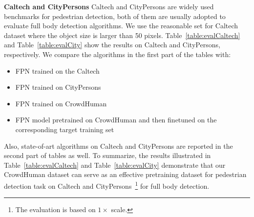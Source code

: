 \documentclass[10pt,twocolumn,letterpaper]{article}
\newcommand{\myparagraph}[1]{{\vspace{0.5em} \noindent \bf #1}}
\begin{document}
\myparagraph{Caltech and CityPersons} Caltech and CityPersons are widely used benchmarks for pedestrian detection, both of them are usually adopted to evaluate full body detection algorithms. %
We use the reasonable set for Caltech dataset where the object size is larger than 50 pixels.  
Table~\ref{table:evalCaltech} and Table~\ref{table:evalCity} show the results on Caltech and CityPersons, respectively. We compare the algorithms in the first part of the tables with:
\begin{itemize}
    \item FPN trained on the Caltech
    \item FPN trained on CityPersons
    \item FPN trained on CrowdHuman
    \item FPN model pretrained on CrowdHuman and then finetuned on the corresponding target training set
\end{itemize}
Also, state-of-art algorithms on Caltech and CityPersons are reported in the second part of tables as well.
To summarize, the results illustrated in Table~\ref{table:evalCaltech} and Table~\ref{table:evalCity}  demonstrate that our CrowdHuman dataset can serve as an effective pretraining dataset for pedestrian detection task on Caltech and CityPersons~\footnote{The evaluation is based on $1\times$ scale.} for full body detection.
\end{document}
